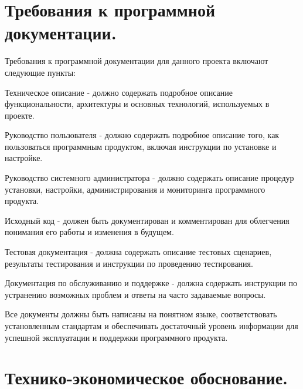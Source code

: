 \section{Требования к программной документации.}




Требования к программной документации для данного проекта включают следующие пункты:

\begin{compactitem}

    \item    Техническое описание - должно содержать подробное описание функциональности, архитектуры и основных технологий, используемых в проекте.
    \item    Руководство пользователя - должно содержать подробное описание того, как пользоваться программным продуктом, включая инструкции по установке и настройке.
    \item    Руководство системного администратора - должно содержать описание процедур установки, настройки, администрирования и мониторинга программного продукта.
    \item    Исходный код - должен быть документирован и комментирован для облегчения понимания его работы и изменения в будущем.
    \item    Тестовая документация - должна содержать описание тестовых сценариев, результаты тестирования и инструкции по проведению тестирования.
    \item    Документация по обслуживанию и поддержке - должна содержать инструкции по устранению возможных проблем и ответы на часто задаваемые вопросы.

\end{compactitem}

Все документы должны быть написаны на понятном языке, соответствовать установленным стандартам и обеспечивать достаточный уровень информации для успешной эксплуатации и поддержки программного продукта.









\section{Технико-экономическое обоснование.}






